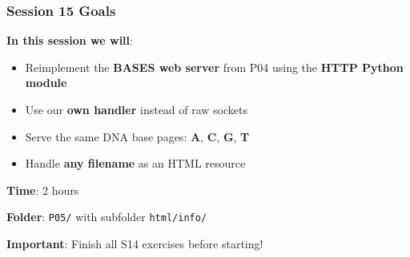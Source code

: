 \documentclass[xcolor=table]{beamer}
\begin{document}
\begin{frame}
\frametitle{Session 15 Goals}

\textbf{In this session we will}:

\begin{itemize}
\item Reimplement the \textbf{BASES web server} from P04 using the \textbf{HTTP Python module}
\item Use our \textbf{own handler} instead of raw sockets
\item Serve the same DNA base pages: \textbf{A}, \textbf{C}, \textbf{G}, \textbf{T}
\item Handle \textbf{any filename} as an HTML resource
\end{itemize}

\vspace{0.4cm}

\textbf{Time}: 2 hours

\vspace{0.2cm}

\textbf{Folder}: \texttt{P05/} with subfolder \texttt{html/info/}

\vspace{0.2cm}

\textbf{Important}: Finish all S14 exercises before starting!

\end{frame}
\end{document}
